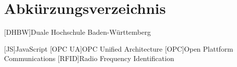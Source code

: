 
\chapter*{Abkürzungsverzeichnis}                   %

\begin{acronym}[DHBW]
[DHBW]{Duale Hochschule Baden-Württemberg}

 [JS]{JavaScript}
 [OPC UA]{OPC Unified Architecture}
 [OPC]{Open Plattform Communications}
 [RFID]{Radio Frequency Identification}

\end{acronym}
